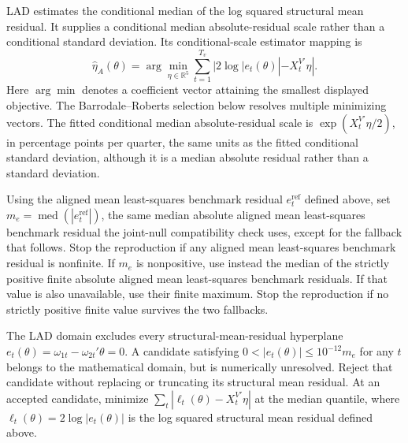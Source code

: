\documentclass[11pt]{article}
\begin{document}
LAD estimates the conditional median of the log squared structural mean residual. It supplies a
conditional median absolute-residual scale rather than a conditional standard deviation. Its
conditional-scale estimator mapping is
\begin{equation*}
 \widehat\eta_A(\theta)
 =\arg\min_{\eta\in\mathbb R^5}
   \sum_{t=1}^{T_v}|2\log|e_t(\theta)|-X_t^{V\prime}\eta|.
\end{equation*}
Here \(\arg\min\) denotes a coefficient vector attaining the smallest displayed objective. The
Barrodale--Roberts selection below resolves multiple minimizing vectors. The fitted conditional median
absolute-residual scale is \(\exp(X_t^{V\prime}\eta/2)\), in percentage points per quarter, the
same units as the fitted conditional standard deviation, although it is a median absolute residual
rather than a standard deviation.

Using the aligned mean least-squares benchmark residual \(e_t^{\mathrm{ref}}\) defined above, set
\(m_e=\operatorname{med}(|e_t^{\mathrm{ref}}|)\), the same median absolute aligned mean least-squares benchmark residual
the joint-null compatibility check uses, except for the fallback that follows. Stop the reproduction
if any aligned mean least-squares benchmark residual is nonfinite. If \(m_e\) is
nonpositive, use instead the median of the strictly positive finite absolute aligned mean
least-squares benchmark residuals. If that value is also unavailable,
use their finite maximum. Stop the reproduction if no strictly positive finite value survives the
two fallbacks.

The LAD domain excludes every structural-mean-residual hyperplane
\(e_t(\theta)=\omega_{1t}-\omega_{2t}'\theta=0\). A candidate satisfying
\(0<|e_t(\theta)|\le10^{-12}m_e\) for any \(t\) belongs to the mathematical domain, but is
numerically unresolved. Reject that candidate without replacing or truncating its structural mean
residual. At an accepted candidate, minimize \(\sum_t|\ell_t(\theta)-X_t^{V\prime}\eta|\) at the
median quantile, where \(\ell_t(\theta)=2\log|e_t(\theta)|\) is the log squared structural mean
residual defined above.
\end{document}

